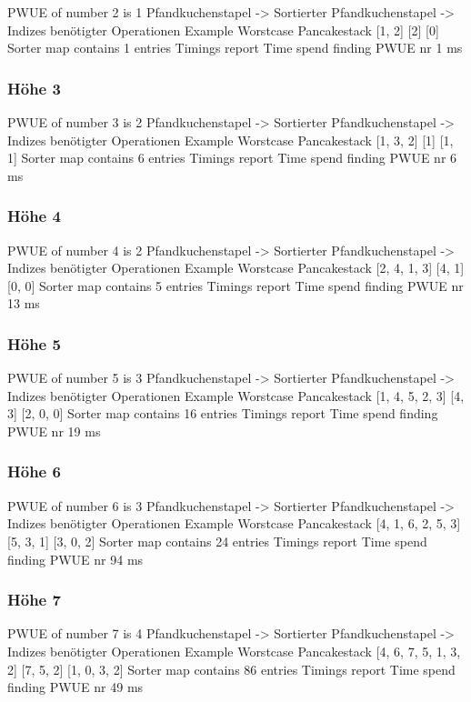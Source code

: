 {    PWUE of number 2 is 1
    Pfandkuchenstapel -> Sortierter Pfandkuchenstapel -> Indizes benötigter Operationen
Example Worstcase Pancakestack
    [1, 2]
    [2]
    [0]
    Sorter map contains 1 entries
    Timings report
    Time spend finding PWUE nr 1 ms
    \subsubsection{Höhe 3}

    PWUE of number 3 is 2
    Pfandkuchenstapel -> Sortierter Pfandkuchenstapel -> Indizes benötigter Operationen
Example Worstcase Pancakestack
    [1, 3, 2]
    [1]
    [1, 1]
    Sorter map contains 6 entries
    Timings report
    Time spend finding PWUE nr 6 ms
    \subsubsection{Höhe 4}

    PWUE of number 4 is 2
    Pfandkuchenstapel -> Sortierter Pfandkuchenstapel -> Indizes benötigter Operationen
Example Worstcase Pancakestack
    [2, 4, 1, 3]
    [4, 1]
    [0, 0]
    Sorter map contains 5 entries
    Timings report
    Time spend finding PWUE nr 13 ms
    \subsubsection{Höhe 5}

    PWUE of number 5 is 3
    Pfandkuchenstapel -> Sortierter Pfandkuchenstapel -> Indizes benötigter Operationen
Example Worstcase Pancakestack
    [1, 4, 5, 2, 3]
    [4, 3]
    [2, 0, 0]
    Sorter map contains 16 entries
    Timings report
    Time spend finding PWUE nr 19 ms
    \subsubsection{Höhe 6}

    PWUE of number 6 is 3
    Pfandkuchenstapel -> Sortierter Pfandkuchenstapel -> Indizes benötigter Operationen
Example Worstcase Pancakestack
    [4, 1, 6, 2, 5, 3]
    [5, 3, 1]
    [3, 0, 2]
    Sorter map contains 24 entries
    Timings report
    Time spend finding PWUE nr 94 ms
    \subsubsection{Höhe 7}

    PWUE of number 7 is 4
    Pfandkuchenstapel -> Sortierter Pfandkuchenstapel -> Indizes benötigter Operationen
Example Worstcase Pancakestack
    [4, 6, 7, 5, 1, 3, 2]
    [7, 5, 2]
    [1, 0, 3, 2]
    Sorter map contains 86 entries
    Timings report
    Time spend finding PWUE nr 49 ms
}
